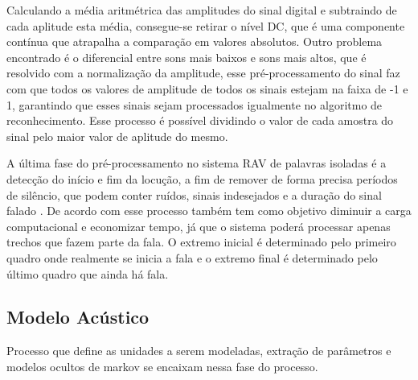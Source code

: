 \begin{enumerate}[A)]
Calculando a média aritmétrica das amplitudes do sinal digital e subtraindo de cada aplitude esta média, consegue-se retirar o nível DC, que é uma componente contínua que atrapalha a comparação em valores absolutos. Outro problema encontrado é o diferencial entre sons mais baixos e sons mais altos, que é resolvido com a normalização da amplitude, esse pré-processamento do sinal faz com que todos os valores de amplitude de todos os sinais estejam na faixa de -1 e 1, garantindo que esses sinais sejam processados igualmente no algoritmo de reconhecimento. Esse processo é possível dividindo o valor de cada amostra do sinal pelo maior valor de aplitude do mesmo. 

A última fase do pré-processamento no sistema RAV de palavras isoladas é a detecção do início e fim da locução, a fim de remover de forma precisa períodos de silêncio, que podem conter ruídos, sinais indesejados e a duração do sinal falado \cite{RavIsolAnderson}. De acordo com  esse processo também tem como objetivo diminuir a carga computacional e economizar tempo, já que o sistema poderá processar apenas trechos que fazem parte da fala.
 O extremo inicial é determinado pelo primeiro quadro onde realmente se inicia a fala e o extremo final é
determinado pelo último quadro que ainda há fala.
\end{enumerate}

\subsection{Modelo Acústico}
Processo que define as unidades a serem modeladas, extração de parâmetros e modelos ocultos de markov se encaixam nessa fase do processo.

